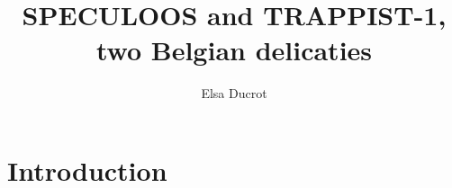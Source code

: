 \documentclass[twocolumn]{aastex631}
\begin{document}
\title{SPECULOOS and TRAPPIST-1, two Belgian delicaties}

\author[0000-0000-0000-0000]{Elsa Ducrot}

\begin{abstract}
    \blindtext
\end{abstract}

\section{Introduction}
\Blindtext[4]
\end{document}
